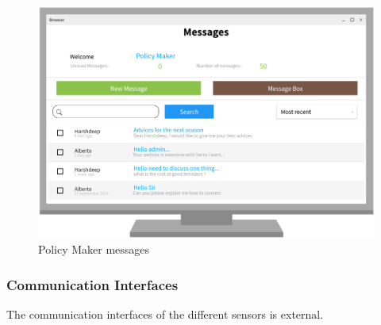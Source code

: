 \begin{figure}[H]

	\centering

	\includegraphics[width=0.8\columnwidth]{Images/messages_policy_maker.png}

	\caption{Policy Maker messages}

	\label{Fig:interface_messages_policy_maker}

\end{figure}


\subsubsection{Communication Interfaces}
The communication interfaces of the different sensors is external.

